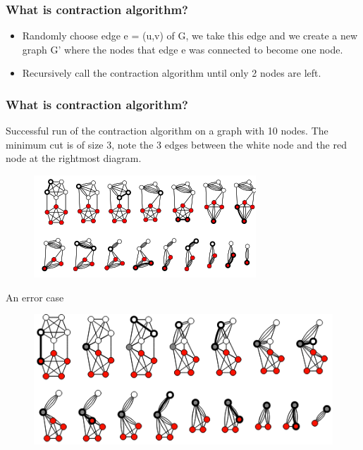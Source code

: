 \documentclass{beamer}
\begin{document}
\begin{frame}

\frametitle{What is contraction algorithm?}

\begin{itemize}
	\item Randomly choose edge e = (u,v) of G, we take this edge and we create a new graph G' where the nodes that edge e was connected to become one node. 
	\item Recursively call the contraction algorithm until only 2 nodes are left. 
	
\end{itemize}


\end{frame}


\begin{frame}
\frametitle{What is contraction algorithm? }


Successful run of the contraction algorithm on a graph with 10 nodes.  The minimum cut is of size 3, note the 3 edges between the white node and the red node at the rightmost diagram.
\begin{figure}
	\includegraphics[scale=0.5]{kargers_diagram}
\end{figure}
An error case
\begin{figure}
	\includegraphics[scale=0.3]{images/error_case}
\end{figure}
\end{frame}
\end{document}
